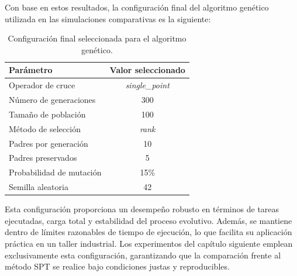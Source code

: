 Con base en estos resultados, la configuración final del algoritmo genético utilizada en las simulaciones comparativas es la siguiente:

\begin{table}[htbp]
\centering
\small
\caption{Configuración final seleccionada para el algoritmo genético.}
\label{tab:config-final-ag}
\begin{tabular}{@{}lc@{}}
\toprule
\textbf{Parámetro} & \textbf{Valor seleccionado} \\
\midrule
Operador de cruce & \textit{single\_point} \\
Número de generaciones & 300 \\
Tamaño de población & 100 \\
Método de selección & \textit{rank} \\
Padres por generación & 10 \\
Padres preservados & 5 \\
Probabilidad de mutación & 15\% \\
Semilla aleatoria & 42 \\
\bottomrule
\end{tabular}
\end{table}

Esta configuración proporciona un desempeño robusto en términos de tareas ejecutadas, carga total y estabilidad del proceso evolutivo. Además, se mantiene dentro de límites razonables de tiempo de ejecución, lo que facilita su aplicación práctica en un taller industrial. Los experimentos del capítulo siguiente emplean exclusivamente esta configuración, garantizando que la comparación frente al método SPT se realice bajo condiciones justas y reproducibles.
